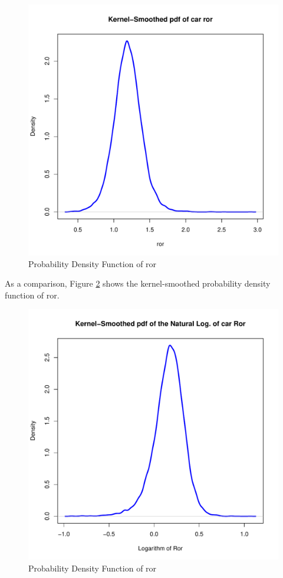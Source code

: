\documentclass[11pt]{paper}
\begin{document}
\begin{figure}[h!]
  \centering
  \includegraphics[scale = 0.5, keepaspectratio=true]{../Figures/density_ror}
  \caption{Probability Density Function of  ror} \label{fig:density_ror}
\end{figure}



\pagebreak
As a comparison, Figure \ref{fig:density_log_ror} shows the kernel-smoothed probability density function  of
ror.

\begin{figure}[h!]
  \centering
  \includegraphics[scale = 0.5, keepaspectratio=true]{../Figures/density_log_ror}
  \caption{Probability Density Function of  ror} \label{fig:density_log_ror}
\end{figure}
\end{document}
